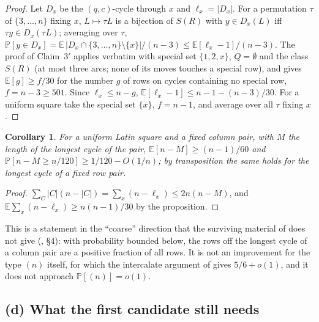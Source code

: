 \documentclass[11pt]{article}
\newtheorem{corollary}[theorem]{Corollary}
\theoremstyle{definition}
\renewcommand{\Pr}{\mathbb{P}}
\begin{document}
\begin{proof}
Let $D_x$ be the $(q,c)$-cycle through $x$ and $\ell_x=|D_x|$.  For a permutation $\tau$ of
$\{3,\dots,n\}$ fixing $x$, $L\mapsto\tau L$ is a bijection of $S(R)$ with $y\in D_x(L)$
iff $\tau y\in D_x(\tau L)$; averaging over $\tau$,
$\Pr[y\in D_x]=\mathbb E\,|D_x\cap\{3,\dots,n\}\setminus\{x\}|/(n-3)\le\mathbb E[\ell_x-1]/(n-3)$.
The proof of Claim~$3'$ applies verbatim with special set $\{1,2,x\}$, $Q=\emptyset$ and
the class $S(R)$ (at most three arcs; none of its moves touches a special row), and gives
$\mathbb E[g]\ge f/30$ for the number $g$ of rows on cycles containing no special row,
$f=n-3\ge501$.  Since $\ell_x\le n-g$, $\mathbb E[\ell_x-1]\le n-1-(n-3)/30$.  For a
uniform square take the special set $\{x\}$, $f=n-1$, and average over all $\tau$ fixing
$x$.
\end{proof}

\begin{corollary}\label{cor:longest}
For a uniform Latin square and a fixed column pair, with $M$ the length of the longest
cycle of the pair, $\mathbb E[n-M]\ge(n-1)/60$ and
$\Pr[n-M\ge n/120]\ge1/120-O(1/n)$; by transposition the same holds for the longest cycle
of a fixed row pair.
\end{corollary}

\begin{proof}
$\sum_C|C|(n-|C|)=\sum_x(n-\ell_x)\le2n(n-M)$, and $\mathbb E\sum_x(n-\ell_x)\ge n(n-1)/30$
by the proposition.
\end{proof}

This is a statement in the ``coarse'' direction that the surviving material of
\cite{CGW08} does not give (\cite{gapnote}, \S4): with probability bounded below, the rows
off the longest cycle of a column pair are a positive fraction of all rows.  It is not an
improvement for the type $(n)$ itself, for which the intercalate argument of
\cite{gapnote} gives $5/6+o(1)$, and it does not approach $\Pr[(n)]=o(1)$.

\subsection*{(d) What the first candidate still needs}
\end{document}
